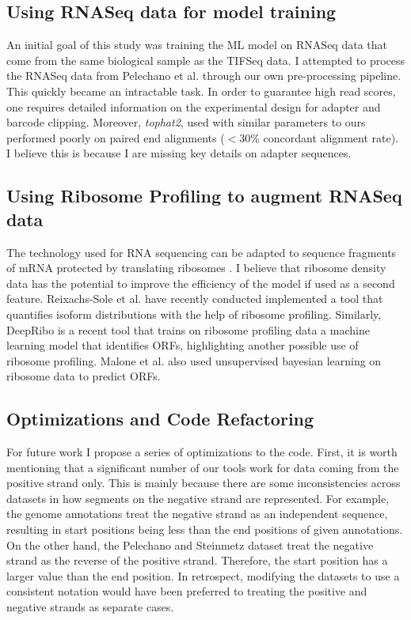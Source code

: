 \documentclass[12pt]{article}
\begin{document}
\subsection{Using RNASeq data for model training} \label{steinmetz_rna}

An initial goal of this study was training the ML model on RNASeq data that come from the same biological sample as the TIFSeq data. I attempted to process the RNASeq data from Pelechano et al. \cite{Pelechano2013} through our own pre-processing pipeline. This quickly became an intractable task. In order to guarantee high read scores, one requires detailed information on the experimental design for adapter and barcode clipping. Moreover, \textit{tophat2}, used with similar parameters to ours performed poorly on paired end alignments ($<30\%$ concordant alignment rate). I believe this is because I are missing key details on adapter sequences. 

\subsection{Using Ribosome Profiling to augment RNASeq data}
The technology used for RNA sequencing can be adapted to sequence fragments of mRNA protected by translating ribosomes \cite{Ingolia2012}. I believe that ribosome density data has the potential to improve the efficiency of the model if used as a second feature. Reixachs-Sole et al. \cite{ReixachsSol2020} have recently conducted implemented a tool that quantifies isoform distributions with the help of ribosome profiling. Similarly, DeepRibo \cite{Clauwaert2019} is a recent tool that trains on ribosome profiling data a machine learning model that identifies ORFs, highlighting another possible use of ribosome profiling. Malone et al. \cite{Malone2017} also used unsupervised bayesian learning on ribosome data to predict ORFs. 
 
\subsection{Optimizations and Code Refactoring}

For future work I propose a series of optimizations to the code. First, it is worth mentioning that a significant number of our tools work for data coming from the positive strand only. This is mainly because there are some inconsistencies across datasets in how segments on the negative strand are represented. For example, the genome annotations treat the negative strand as an independent sequence, resulting in start positions being less than the end positions of given annotations. On the other hand, the Pelechano and Steinmetz \cite{Pelechano2013} dataset treat the negative strand as the reverse of the positive strand. Therefore, the start position has a larger value than the end position. In retrospect, modifying the datasets to use a consistent notation would have been preferred to treating the positive and negative strands as separate cases. 
\end{document}

